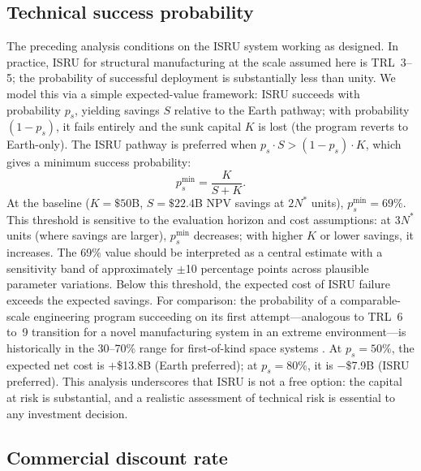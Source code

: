 \documentclass[preprint,12pt]{elsarticle}
\begin{document}
\subsection{Technical success probability}
\label{sec:success_probability}

The preceding analysis conditions on the ISRU system working as designed. In practice, ISRU for structural manufacturing at the scale assumed here is TRL~3--5; the probability of successful deployment is substantially less than unity. We model this via a simple expected-value framework: ISRU succeeds with probability $p_s$, yielding savings $S$ relative to the Earth pathway; with probability $(1 - p_s)$, it fails entirely and the sunk capital $K$ is lost (the program reverts to Earth-only). The ISRU pathway is preferred when $p_s \cdot S > (1 - p_s) \cdot K$, which gives a minimum success probability:
\begin{equation}
  p_s^{\min} = \frac{K}{S + K}.
  \label{eq:p_success}
\end{equation}
At the baseline ($K = \$50$B, $S = \$22.4$B NPV savings at $2N^*$ units), $p_s^{\min} = 69\%$. This threshold is sensitive to the evaluation horizon and cost assumptions: at $3N^*$ units (where savings are larger), $p_s^{\min}$ decreases; with higher $K$ or lower savings, it increases. The 69\% value should be interpreted as a central estimate with a sensitivity band of approximately $\pm$10 percentage points across plausible parameter variations. Below this threshold, the expected cost of ISRU failure exceeds the expected savings. For comparison: the probability of a comparable-scale engineering program succeeding on its first attempt---analogous to TRL~6 to~9 transition for a novel manufacturing system in an extreme environment---is historically in the 30--70\% range for first-of-kind space systems \cite{wertz2011}. At $p_s = 50\%$, the expected net cost is $+$\$13.8B (Earth preferred); at $p_s = 80\%$, it is $-$\$7.9B (ISRU preferred). This analysis underscores that ISRU is not a free option: the capital at risk is substantial, and a realistic assessment of technical risk is essential to any investment decision.

\subsection{Commercial discount rate}
\label{sec:commercial_rate}
\end{document}
